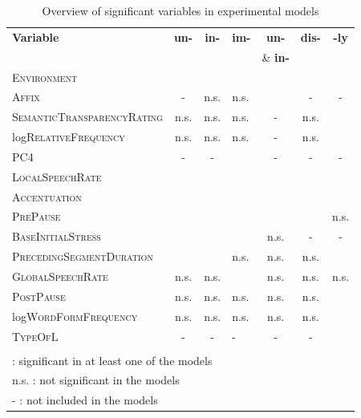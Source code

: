 \begin{table}[t!]
	\caption{Overview of significant variables in experimental models}
	\label{tbl: Overview of complete results in the experimental study}
	\centering
	
		\begin{tabular} {lcclccc}
			
			
			\textbf{Variable} & \textbf{un-} & \textbf{in-} & \textbf{im-}&\textbf{un-} &\textbf{dis-}& \textbf{-ly}\\
			& & & &\& \textbf{in-}  && \\
			\midrule			
			\textsc{Environment}& \checkmark & \checkmark  & \checkmark  &\checkmark   &  \checkmark & \checkmark \\ 
			\textsc{Affix }&- &n.s. & n.s. & \checkmark  &- & -\\ 
			\textsc{SemanticTransparencyRating}&n.s.& n.s.&n.s.  & - &n.s. &\checkmark  \\
			log\textsc{RelativeFrequency}&n.s.& n.s.&n.s.  & - &n.s. &\checkmark  \\
					\textsc{PC4}&-& -&\checkmark & - &- &-  \\	
			\textsc{LocalSpeechRate}&\checkmark & \checkmark & \checkmark & \checkmark  &\checkmark  & \checkmark \\	
			\textsc{Accentuation}&\checkmark &  \checkmark & \checkmark &\checkmark  & \checkmark & \checkmark \\		
			\textsc{PrePause}&\checkmark &\checkmark& \checkmark&\checkmark  & \checkmark & n.s.\\
			\textsc{BaseInitialStress}&\checkmark& \checkmark &\checkmark  & n.s. &- &-\\
			
			\textsc{PrecedingSegmentDuration}&\checkmark &\checkmark & n.s. & n.s.&n.s.  & \checkmark \\

			\textsc{GlobalSpeechRate}&n.s.& n.s. &\checkmark  &n.s. &  n.s. & n.s.\\	

			\textsc{PostPause}&n.s. & n.s.& n.s. &n.s.  & n.s. &\checkmark \\		
			log\textsc{WordFormFrequency}&n.s. & n.s.& n.s. &n.s.  & n.s. &\checkmark \\		
						\textsc{TypeOfL}&- & -& -&- & -&\checkmark \\
			\midrule\\
			
			\multicolumn{6}{l}{\small \checkmark \hspace*{0.2cm}: significant in at least one of the models} \\			
			\multicolumn{6}{l}{\small n.s. : not significant in the models} \\			
			\multicolumn{6}{l}{\small - \hspace*{0.45cm}: not included in the models} \\			
			
		\end{tabular}
	
	
	
	
\end{table}




